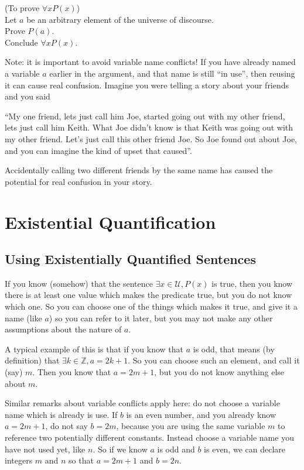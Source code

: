 \begin{fitch*}
	\textrm{(To prove $\forall x P(x)$)}\\
	\textrm{Let $a$ be an arbitrary element of the universe of discourse.}\\
	\textrm{Prove $P(a)$}.\\
	\textrm{Conclude $\forall x P(x)$.}
\end{fitch*}

Note:  it is important to avoid variable name conflicts!  If you have already named a variable $a$ earlier in the argument, and that name is still ``in use'', then reusing it can cause real confusion.  Imagine you were telling a story about your friends and you said

``My one friend, lets just call him Joe, started going out with my other friend, lets just call him Keith.  What Joe didn't know is that Keith was going out with my other friend.  Let's just call this other friend Joe.  So Joe found out about Joe, and you can imagine the kind of upset that caused''.

Accidentally calling two different friends by the same name has caused the potential for real confusion in your story.

\newpage

\section{Existential Quantification}

\subsection{Using Existentially Quantified Sentences}

If you know (somehow) that the sentence $\exists x \in \mathcal{U}, P(x)$ is true, then you know there is at least one value which makes the predicate true, but you do not know which one.  So you can choose one of the things which makes it true, and give it a name (like $a$) so you can refer to it later, but you may not make any other assumptions about the nature of $a$.

A typical example of this is that if you know that $a$ is odd, that means (by definition) that $\exists k \in \mathbb{Z}, a=2k+1$.  So you can choose such an element, and call it (say) $m$.  Then you know that $a=2m+1$, but you do not know anything else about $m$.  

Similar remarks about variable conflicts apply here:  do not choose a variable name which is already is use.  If $b$ is an even number, and you already know $a=2m+1$, do not say $b = 2m$, because you are using the same variable $m$ to reference two potentially different constants.  Instead choose a variable name you have not used yet, like $n$.  So if we know $a$ is odd and $b$ is even, we can declare integers $m$ and $n$ so that $a=2m+1$ and $b = 2n$.

